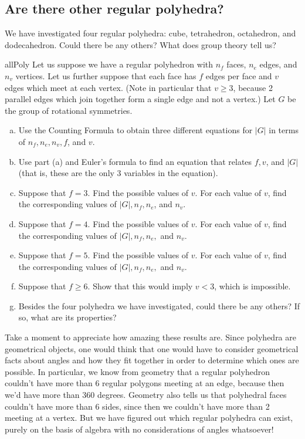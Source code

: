\subsection{Are there  other regular polyhedra?}

We have investigated four regular polyhedra: cube, tetrahedron, octahedron, and dodecahedron.  Could there be any others?  What does group theory tell us? 


\begin{exercise}{allPoly}
Let us suppose we have a regular polyhedron with $n_f$ faces, $n_e$ edges, and $n_v$ vertices.  Let us further suppose that each face has $f$ edges per face and $v$ edges which meet at each vertex. (Note in particular that $v \ge 3$, because 2 parallel edges which join together form a single edge and not a vertex.) Let $G$ be the group of rotational symmetries.
\begin{enumerate}[(a)]
\item
Use the Counting Formula to obtain three different equations for $|G|$ in terms of $n_f, n_e, n_v, f$, and $v$.
\item
Use part (a) and Euler's formula to find an equation that relates $f, v$, and $|G|$ (that is, these are the only 3 variables in the equation).
\item
Suppose that $f=3$.  Find the possible values of $v$.  For each value of $v$, find the corresponding values of $|G|, n_f, n_e$, and $n_v$.
\item
Suppose that $f=4$.  Find the possible values of $v$.  For each value of $v$, find the corresponding values of $|G|, n_f, n_e,$ and $n_v$.
\item
Suppose that $f=5$.  Find the possible values of $v$.  For each value of $v$, find the corresponding values of $|G|, n_f, n_e,$ and $n_v$.
\item
Suppose that $f \ge 6$. Show that this would imply $v<3$, which is impossible.
\item
Besides the four polyhedra we have investigated, could there be any others? If so, what are its properties?
\end{enumerate}
\end{exercise}

Take a moment to appreciate how amazing these results are.  Since polyhedra are geometrical objects, one would think that one would have to consider geometrical facts about angles and how they fit together in order to determine which ones are possible.  In particular, we know from geometry that a regular polyhedron couldn't have more than 6 regular polygons meeting at an edge, because then we'd have more than 360 degrees. Geometry also tells us that polyhedral faces couldn't have more than 6 sides, since then we couldn't have more than 2 meeting at a vertex. But we have figured out which regular polyhedra can exist, purely on the basis of algebra with no considerations of angles whatsoever!  

